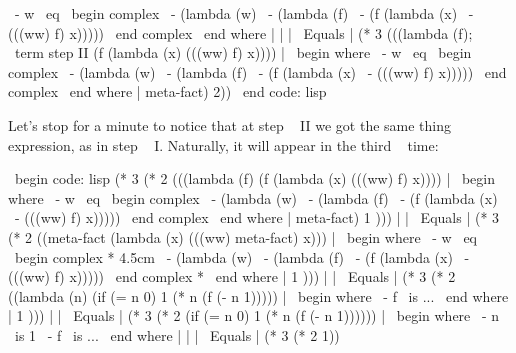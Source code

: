 {                                        \ - w { \ eq } \ begin {complex}
                                                  \ - (lambda (w)
                                                  \ -   (lambda (f)
                                                  \ -     (f (lambda (x)
                                                  \ -          (((ww) f) x)))))
                                                  \ end {complex}
                                        \ end {where} |
| | \ Equals | (* 3 (((lambda (f); \ term {step II}
            (f (lambda (x)
                 (((ww) f) x)))) | \ begin {where}
                                    \ - w { \ eq } \ begin {complex}
                                              \ - (lambda (w)
                                              \ -   (lambda (f)
                                              \ -     (f (lambda (x)
                                              \ -          (((ww) f) x)))))
                                              \ end {complex}
                                    \ end {where} |
          meta-fact)
         2))
\ end {code: lisp}

Let's stop for a minute to notice that at step ~ II we got the same thing
expression, as in step ~ I. Naturally, it will appear in the third ~ time:

\ begin {code: lisp}
(* 3 (* 2 (((lambda (f)
              (f (lambda (x)
                   (((ww) f) x)))) | \ begin {where}
                                      \ - w { \ eq } \ begin {complex}
                                                \ - (lambda (w)
                                                \ -   (lambda (f)
                                                \ -     (f (lambda (x)
                                                \ -          (((ww) f) x)))))
                                                \ end {complex}
                                      \ end {where} |
            meta-fact)
           1 )))
| | \ Equals | (* 3 (* 2 ((meta-fact (lambda (x)
                           (((ww) meta-fact) x))) | \ begin {where}
                                                    \ - w { \ eq } \ begin {complex *} {4.5cm}
                                                              \ - (lambda (w)
                                                              \ -   (lambda (f)
                                                              \ -     (f (lambda (x)
                                                              \ -          (((ww) f) x)))))
                                                              \ end {complex *}
                                                    \ end {where} |
              1 )))
| | \ Equals | (* 3 (* 2 ((lambda (n)
                (if (= n 0) 1
                    (* n (f (- n 1))))) | \ begin {where}
                                          \ - f { \ is } ...
                                          \ end {where} |
              1 )))
| | \ Equals | (* 3 (* 2 (if (= n 0) 1 (* n (f (- n 1)))))) | \ begin {where}
                                                         \ - n { \ is } 1
                                                         \ - f { \ is } ...
                                                         \ end {where} |
| | \ Equals | (* 3 (* 2 1))

}
